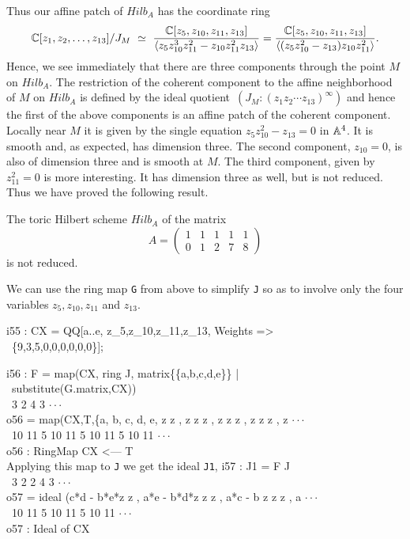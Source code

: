 Thus our affine patch of $Hilb_A$ has the coordinate ring 
$$\mathbb{C}[z_1,z_2,\ldots,z_{13}]/J_M \,\, \simeq \,\,
\frac{\mathbb{C}[z_5,z_{10},z_{11},z_{13}]}{ \langle z_5 z_{{10}}^3 z_{11}^2 -
  z_{10}z_{11}^2 z_{13} \rangle} = \frac{\mathbb{C}[z_5,z_{10},z_{11},z_{13}]}
{\langle (z_5 z_{10}^2 -z_{13}) z_{10}z_{11}^2 \rangle}.$$
Hence, we see immediately that there are three
components through the point $M$ on $Hilb_A$. The restriction of the
coherent component to the affine neighborhood of $M$ on $Hilb_A$ is
defined by the ideal quotient $\, (J_M : (z_1 z_2 \cdots
z_{13})^\infty) $ and hence the first of the above components 
is an affine patch of the coherent component. Locally near $M$ it is  
given by the single equation $z_5 z_{10}^2 - z_{13} = 0$ in $\mathbb{A}^4$. 
It is smooth and, as expected, has dimension three. The second
component, $z_{10} = 0$, is also of dimension three and is smooth at $M$.
The third component, given by $z_{11}^2 = 0$ is more interesting.  It
has dimension three as well, but is not reduced.  Thus we have proved
the following result.

\begin{proposition}
The toric Hilbert scheme $Hilb_A$ of the matrix 
$$A = \left( \begin{matrix}
           1 & 1 & 1 & 1 & 1  \\ 
           0 & 1 & 2 & 7 & 8 
\end{matrix} \right)$$
is not reduced.
\end{proposition}

We can use the ring map {\tt G} from above to simplify {\tt J} so as
to involve only the four variables $z_5, z_{10},z_{11}$ and $z_{13}$.

\beginOutput
i55 : CX = QQ[a..e, z_5,z_10,z_11,z_13, Weights =>\\
\            \{9,3,5,0,0,0,0,0,0\}];\\
\endOutput
 
\beginOutput
i56 : F = map(CX, ring J, matrix\{\{a,b,c,d,e\}\} | \\
\                  substitute(G.matrix,CX))\\
\emptyLine
\                                          3  2      4  3               $\cdot\cdot\cdot$\\
o56 = map(CX,T,\{a, b, c, d, e, z  z  , z z  z  , z z  z  , z z  z  , z $\cdot\cdot\cdot$\\
\                                10 11   5 10 11   5 10 11   5 10 11    $\cdot\cdot\cdot$\\
\emptyLine
o56 : RingMap CX <--- T\\
\endOutput
Applying this map to {\tt J} we get the ideal {\tt J1}, 
\beginOutput
i57 : J1 = F J\\
\emptyLine
\                                            3  2          2   4  3     $\cdot\cdot\cdot$\\
o57 = ideal (c*d - b*e*z  z  , a*e - b*d*z z  z  , a*c - b z z  z  , a $\cdot\cdot\cdot$\\
\                        10 11             5 10 11           5 10 11    $\cdot\cdot\cdot$\\
\emptyLine
o57 : Ideal of CX\\
\endOutput

